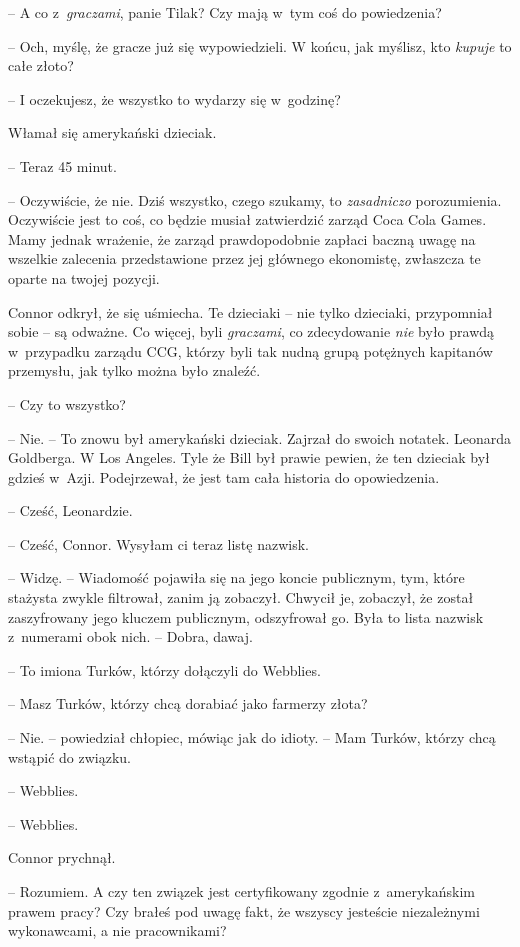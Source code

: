 \documentclass[oneside,polish,11pt,rmheadings]{mwbk}
\begin{document}
-- A co z~\textit{graczami}, panie Tilak? Czy mają w~tym coś do powiedzenia?

-- Och, myślę, że gracze już się wypowiedzieli. W końcu, jak myślisz, kto \textit{kupuje }to całe złoto?

-- I oczekujesz, że wszystko to wydarzy się w~godzinę?

Włamał się amerykański dzieciak. 

-- Teraz 45 minut.

-- Oczywiście, że nie. Dziś wszystko, czego szukamy, to \textit{zasadniczo }porozumienia. Oczywiście jest to coś, co będzie musiał zatwierdzić zarząd Coca Cola Games. Mamy jednak wrażenie, że zarząd prawdopodobnie zapłaci baczną uwagę na wszelkie zalecenia przedstawione przez jej głównego ekonomistę, zwłaszcza te oparte na twojej pozycji.

Connor odkrył, że się uśmiecha. Te dzieciaki -- nie tylko dzieciaki, przypomniał sobie -- są odważne. Co więcej, byli \textit{graczami}, co zdecydowanie \textit{nie }było prawdą w~przypadku zarządu CCG, którzy byli tak nudną grupą potężnych kapitanów przemysłu, jak tylko można było znaleźć. 

-- Czy to wszystko? 

-- Nie. -- To znowu był amerykański dzieciak. Zajrzał do swoich notatek. Leonarda Goldberga. W Los Angeles. Tyle że Bill był prawie pewien, że ten dzieciak był gdzieś w~Azji. Podejrzewał, że jest tam cała historia do opowiedzenia.

-- Cześć, Leonardzie.

-- Cześć, Connor. Wysyłam ci teraz listę nazwisk. 

-- Widzę. -- Wiadomość pojawiła się na jego koncie publicznym, tym, które stażysta zwykle filtrował, zanim ją zobaczył. Chwycił je, zobaczył, że został zaszyfrowany jego kluczem publicznym, odszyfrował go. Była to lista nazwisk z~numerami obok nich. -- Dobra, dawaj. 

-- To imiona Turków, którzy dołączyli do Webblies.

-- Masz Turków, którzy chcą dorabiać jako farmerzy złota?

-- Nie. -- powiedział chłopiec, mówiąc jak do idioty. -- Mam Turków, którzy chcą wstąpić do związku.

-- Webblies.

-- Webblies.

Connor prychnął. 

-- Rozumiem. A czy ten związek jest certyfikowany zgodnie z~amerykańskim prawem pracy? Czy brałeś pod uwagę fakt, że wszyscy jesteście niezależnymi wykonawcami, a nie pracownikami?
\end{document}
